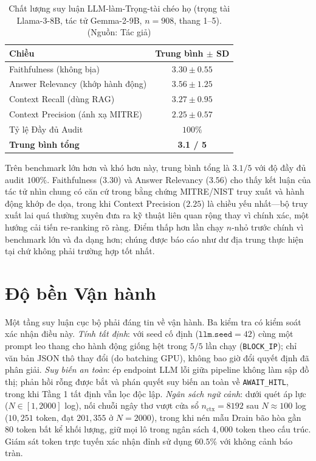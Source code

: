 \begin{table}[!htbp]
    \centering
    \caption{Chất lượng suy luận LLM-làm-Trọng-tài chéo họ (trọng tài Llama-3-8B, tác tử Gemma-2-9B, $n=908$, thang 1--5). (Nguồn: Tác giả)}
    \label{tab:ragas}
    \begin{tabular}{|l|c|}
        \hline
        \textbf{Chiều} & \textbf{Trung bình $\pm$ SD} \\ \hline
        Faithfulness (không bịa) & $3.30 \pm 0.55$ \\ \hline
        Answer Relevancy (khớp hành động) & $3.56 \pm 1.25$ \\ \hline
        Context Recall (dùng RAG) & $3.27 \pm 0.95$ \\ \hline
        Context Precision (ánh xạ MITRE) & $2.25 \pm 0.57$ \\ \hline
        Tỷ lệ Đầy đủ Audit & $100\%$ \\ \hline
        \textbf{Trung bình tổng} & \textbf{3.1 / 5} \\ \hline
    \end{tabular}
\end{table}

Trên benchmark lớn hơn và khó hơn này, trung bình tổng là $3.1/5$ với độ đầy đủ audit $100\%$. Faithfulness ($3.30$) và Answer Relevancy ($3.56$) cho thấy kết luận của tác tử nhìn chung có căn cứ trong bằng chứng MITRE/NIST truy xuất và hành động khớp đe dọa, trong khi Context Precision ($2.25$) là chiều yếu nhất---bộ truy xuất lai quá thường xuyên đưa ra kỹ thuật liên quan rộng thay vì chính xác, một hướng cải tiến re-ranking rõ ràng. Điểm thấp hơn lần chạy $n$-nhỏ trước chính vì benchmark lớn và đa dạng hơn; chúng được báo cáo như dư địa trung thực hiện tại chứ không phải trường hợp tốt nhất.

\section{Độ bền Vận hành}
Một tầng suy luận cục bộ phải đáng tin về vận hành. Ba kiểm tra có kiểm soát xác nhận điều này. \emph{Tính tất định}: với seed cố định ($\texttt{llm.seed}=42$) cùng một prompt leo thang cho hành động giống hệt trong $5/5$ lần chạy (\texttt{BLOCK\_IP}); chỉ văn bản JSON thô thay đổi (do batching GPU), không bao giờ đổi quyết định đã phân giải. \emph{Suy biến an toàn}: ép endpoint LLM lỗi giữa pipeline không làm sập đồ thị; phản hồi rỗng được bắt và phán quyết suy biến an toàn về \texttt{AWAIT\_HITL}, trong khi Tầng 1 tất định vẫn lọc độc lập. \emph{Ngân sách ngữ cảnh}: dưới quét áp lực ($N\in[1,2000]$ log), nối chuỗi ngây thơ vượt cửa sổ $n_{\text{ctx}}=8192$ sau $N\approx100$ log ($10{,}251$ token, đạt $201{,}355$ ở $N=2000$), trong khi nén mẫu Drain bão hòa gần $80$ token bất kể khối lượng, giữ mọi lô trong ngân sách $4{,}000$ token theo cấu trúc. Giám sát token trực tuyến xác nhận đỉnh sử dụng $60.5\%$ với không cảnh báo tràn.

